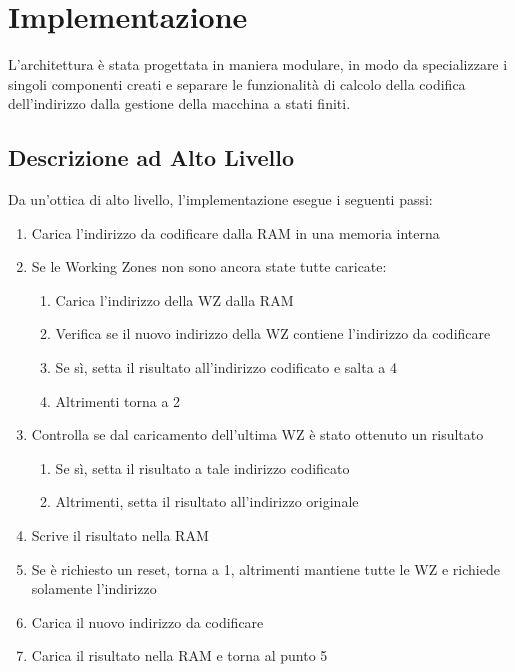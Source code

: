 \documentclass{article}
\begin{document}

\section{Implementazione}

L'architettura è stata progettata in maniera modulare, in modo da specializzare i singoli componenti creati e separare le funzionalità
di calcolo della codifica dell'indirizzo dalla gestione della macchina a stati finiti.

\subsection{Descrizione ad Alto Livello}
\label{alto_livello}

Da un'ottica di alto livello, l'implementazione esegue i seguenti passi:

\begin{enumerate}
\item Carica l'indirizzo da codificare dalla RAM in una memoria interna
\item Se le Working Zones non sono ancora state tutte caricate:
	\begin{enumerate}	
	\item Carica l'indirizzo della WZ dalla RAM
	\item Verifica se il nuovo indirizzo della WZ contiene l'indirizzo da codificare
	\item Se sì, setta il risultato all'indirizzo codificato e salta a 4
	\item Altrimenti torna a 2
	\end{enumerate}
\item Controlla se dal caricamento dell'ultima WZ è stato ottenuto un risultato
	\begin{enumerate}
	\item Se sì, setta il risultato a tale indirizzo codificato
	\item Altrimenti, setta il risultato all'indirizzo originale
	\end{enumerate}
\item Scrive il risultato nella RAM
\item Se è richiesto un reset, torna a 1, altrimenti mantiene tutte le WZ e richiede solamente l'indirizzo
\item Carica il nuovo indirizzo da codificare 
\item Carica il risultato nella RAM e torna al punto 5
\end{enumerate}
\end{document}
